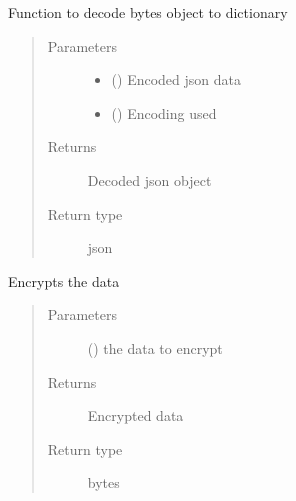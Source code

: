 \documentclass[letterpaper,10pt,english]{sphinxmanual}
\begin{document}
\begin{fulllineitems}
\begin{fulllineitems}
\label{\detokenize{Message:Message.Message._json_decode}}
Function to decode bytes object to dictionary
\begin{quote}\begin{description}
\item[{Parameters}] \leavevmode\begin{itemize}
\item {} 
 () \textendash{} Encoded json data

\item {} 
 () \textendash{} Encoding used

\end{itemize}

\item[{Returns}] \leavevmode
Decoded json object

\item[{Return type}] \leavevmode
json

\end{description}\end{quote}

\end{fulllineitems}


\begin{fulllineitems}
\label{\detokenize{Message:Message.Message._encrypt_server}}
Encrypts the data
\begin{quote}\begin{description}
\item[{Parameters}] \leavevmode
{} () \textendash{} the data to encrypt

\item[{Returns}] \leavevmode
Encrypted data

\item[{Return type}] \leavevmode
bytes


\end{description}
\end{quote}
\end{fulllineitems}
\end{fulllineitems}
\end{document}
